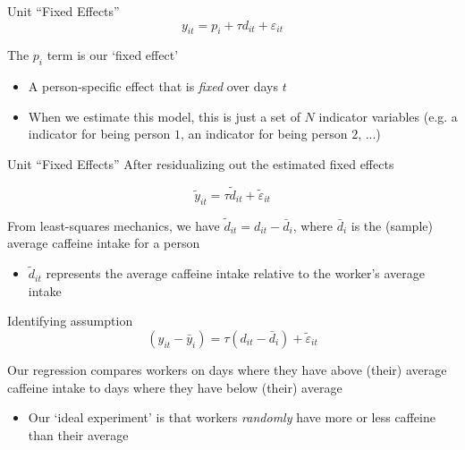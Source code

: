\documentclass[aspectratio=169,t,11pt,table]{beamer}
\begin{document}
\begin{frame}{Unit ``Fixed Effects''}
  \vspace*{-\bigskipamount}
  $$
    y_{it} = p_i + \tau d_{it} + \varepsilon_{it}
  $$
  
  \bigskip
  The $p_i$ term is our `fixed effect'
  \begin{itemize}
    \item A person-specific effect that is \emph{fixed} over days $t$

    \item When we estimate this model, this is just a set of $N$ indicator variables (e.g. a indicator for being person $1$, an indicator for being person $2$, ...)
  \end{itemize}
\end{frame}

\begin{frame}{Unit ``Fixed Effects''}
  After residualizing out the estimated fixed effects

  $$
    \tilde{y}_{it} = \tau \tilde{d}_{it} + \tilde{\varepsilon}_{it}
  $$
  
  \bigskip
  From least-squares mechanics, we have $\tilde{d}_{it} = d_{it} - \bar{d}_i$, where $\bar{d}_i$ is the (sample) average caffeine intake for a person
  \begin{itemize}
    \item $\tilde{d}_{it}$ represents the average caffeine intake relative to the worker's average intake
  \end{itemize}
\end{frame}

\begin{frame}{Identifying assumption}
  \vspace*{-\bigskipamount}
  $$
    \left(y_{it} - \bar{y}_i\right) = \tau \left(d_{it} - \bar{d}_i\right) + \tilde{\varepsilon}_{it}
  $$
  
  \bigskip
  Our regression compares workers on days where they have above (their) average caffeine intake to days where they have below (their) average
  \begin{itemize}
    \item Our `ideal experiment' is that workers \emph{randomly} have more or less caffeine than their average
  \end{itemize}
\end{frame}
\end{document}
